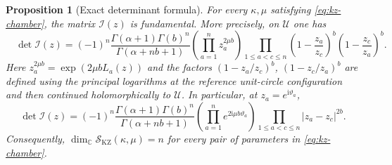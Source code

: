 \documentclass[12pt]{amsart}
\newtheorem{prop}[thm]{Proposition}
\theoremstyle{definition}
\numberwithin{equation}{section}
\theoremstyle{definition}
\let\mc\mathcal
\let\ka\kappa
\let\le\leqslant
\def\C{{\mathbb C}}
\def\beq{\begin{equation}}
\def\eeq{\end{equation}}
\begin{document}
\begin{prop}[Exact determinant formula]\label{prop:kz-basis}
For every $\ka,\mu$ satisfying \eqref{eq:kz-chamber}, the matrix
$\mc I(z)$ is fundamental. More precisely, on $\mc U$ one has
\beq\label{eq:kz-exact-det}
 \boxed{\quad
 \det\mc I(z)=(-1)^n
 \frac{\Gamma(\alpha+1)\Gamma(b)^n}
 {\Gamma(\alpha+nb+1)}
 \left(\prod_{a=1}^n z_a^{2\mu b}\right)
 \prod_{1\le a<c\le n}
 \left(1-\frac{z_a}{z_c}\right)^b
 \left(1-\frac{z_c}{z_a}\right)^b.
 \quad}
\eeq
Here $z_a^{2\mu b}=\exp(2\mu b L_a(z))$ and the factors
$(1-z_a/z_c)^b$, $(1-z_c/z_a)^b$ are defined using the
principal logarithms at the reference unit-circle configuration
and then continued holomorphically to $\mc U$.
In particular, at $z_a=e^{\mathrm{i}\vartheta_a}$,
\beq\label{eq:kz-det-circle}
 \det\mc I(z)=(-1)^n
 \frac{\Gamma(\alpha+1)\Gamma(b)^n}
 {\Gamma(\alpha+nb+1)}
 \left(\prod_{a=1}^n e^{2\mathrm{i}\mu b\vartheta_a}\right)
 \prod_{1\le a<c\le n}|z_a-z_c|^{2b}.
\eeq
Consequently,
$\dim_\C\mc S_{\mathrm{KZ}}(\ka,\mu)=n$
for every pair of parameters in \eqref{eq:kz-chamber}.
\end{prop}
\end{document}
